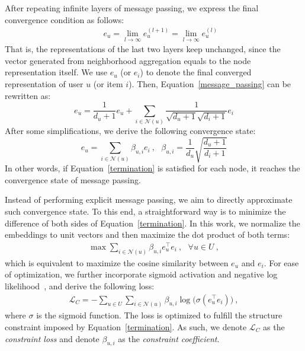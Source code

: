 \documentclass[sigconf,authorversion]{acmart}
\begin{document}
After repeating infinite layers of message passing, we express the final convergence condition as follows:
\begin{eqnarray}
&&
e_u = \lim_{l \to \infty}e_u^{(l+1)} = \lim_{l \to \infty}e_u^{(l)}
\end{eqnarray}
That is, the representations of the last two layers keep unchanged, since the vector generated from neighborhood aggregation equals to the node representation itself. We use $e_u$ (or $e_i$) to denote the final converged representation of user $u$ (or item $i$). Then, Equation~\ref{message_passing} can be rewritten as:
\begin{equation}
e_u = \frac{1}{{d}_u + 1} e_{u} + \sum_{i \in \mathcal{N}(u)} \frac{1}{\sqrt{{d}_u + 1}\sqrt{ {d}_i + 1}} e_i \label{message_passing3}
\end{equation}
After some simplifications, we derive the following convergence state:
\begin{equation}
e_u = \sum_{i \in \mathcal{N}(u)} \beta_{u, i} e_i \label{termination}~, \:\:\: \beta_{u, i} = \frac{1}{d_u} \sqrt{\frac{{d}_u + 1}{{d}_i + 1}}
\end{equation}
In other words, if Equation~\ref{termination} is satisfied for each node, it reaches the convergence state of message passing. 

Instead of performing explicit message passing, we aim to directly approximate such convergence state. To this end, a straightforward way is to minimize the difference of both sides of Equation~\ref{termination}. In this work, we normalize the embeddings to unit vectors and then maximize the dot product of both terms:
\begin{eqnarray}
     \operatorname{max} \sum_{i \in \mathcal{N}(u)} \beta_{u, i} e_u^{\top} e_i~,\:\:\: \forall u \in U \:, \label{structure_target}
\end{eqnarray}
which is equivalent to maximize the cosine similarity between $e_u$ and $e_i$. For ease of optimization, we further incorporate sigmoid activation and negative log likelihood~\cite{cross_entropy_support}, and derive the following loss:
\begin{eqnarray}
\mathcal{L}_C = -\sum_{u \in U} \sum_{i \in \mathcal{N}(u)} \beta_{u, i} \log \big(\sigma(e_u^{\top} e_{i}) \big) \:, \label{final_UltraGCN}
\end{eqnarray}
where $\sigma$ is the sigmoid function. The loss is optimized to fulfill the structure constraint imposed by Equation~\ref{termination}. As such, we denote $\mathcal{L}_C$ as the \textit{constraint loss} and denote $\beta_{u,i}$ as the \textit{constraint coefficient}. 
\end{document}
